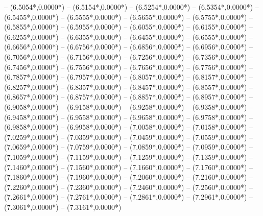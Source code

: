 {	-- ({6.5054*\dx},{0.0000*\dy})
	-- ({6.5154*\dx},{0.0000*\dy})
	-- ({6.5254*\dx},{0.0000*\dy})
	-- ({6.5354*\dx},{0.0000*\dy})
	-- ({6.5455*\dx},{0.0000*\dy})
	-- ({6.5555*\dx},{0.0000*\dy})
	-- ({6.5655*\dx},{0.0000*\dy})
	-- ({6.5755*\dx},{0.0000*\dy})
	-- ({6.5855*\dx},{0.0000*\dy})
	-- ({6.5955*\dx},{0.0000*\dy})
	-- ({6.6055*\dx},{0.0000*\dy})
	-- ({6.6155*\dx},{0.0000*\dy})
	-- ({6.6255*\dx},{0.0000*\dy})
	-- ({6.6355*\dx},{0.0000*\dy})
	-- ({6.6455*\dx},{0.0000*\dy})
	-- ({6.6555*\dx},{0.0000*\dy})
	-- ({6.6656*\dx},{0.0000*\dy})
	-- ({6.6756*\dx},{0.0000*\dy})
	-- ({6.6856*\dx},{0.0000*\dy})
	-- ({6.6956*\dx},{0.0000*\dy})
	-- ({6.7056*\dx},{0.0000*\dy})
	-- ({6.7156*\dx},{0.0000*\dy})
	-- ({6.7256*\dx},{0.0000*\dy})
	-- ({6.7356*\dx},{0.0000*\dy})
	-- ({6.7456*\dx},{0.0000*\dy})
	-- ({6.7556*\dx},{0.0000*\dy})
	-- ({6.7656*\dx},{0.0000*\dy})
	-- ({6.7756*\dx},{0.0000*\dy})
	-- ({6.7857*\dx},{0.0000*\dy})
	-- ({6.7957*\dx},{0.0000*\dy})
	-- ({6.8057*\dx},{0.0000*\dy})
	-- ({6.8157*\dx},{0.0000*\dy})
	-- ({6.8257*\dx},{0.0000*\dy})
	-- ({6.8357*\dx},{0.0000*\dy})
	-- ({6.8457*\dx},{0.0000*\dy})
	-- ({6.8557*\dx},{0.0000*\dy})
	-- ({6.8657*\dx},{0.0000*\dy})
	-- ({6.8757*\dx},{0.0000*\dy})
	-- ({6.8857*\dx},{0.0000*\dy})
	-- ({6.8957*\dx},{0.0000*\dy})
	-- ({6.9058*\dx},{0.0000*\dy})
	-- ({6.9158*\dx},{0.0000*\dy})
	-- ({6.9258*\dx},{0.0000*\dy})
	-- ({6.9358*\dx},{0.0000*\dy})
	-- ({6.9458*\dx},{0.0000*\dy})
	-- ({6.9558*\dx},{0.0000*\dy})
	-- ({6.9658*\dx},{0.0000*\dy})
	-- ({6.9758*\dx},{0.0000*\dy})
	-- ({6.9858*\dx},{0.0000*\dy})
	-- ({6.9958*\dx},{0.0000*\dy})
	-- ({7.0058*\dx},{0.0000*\dy})
	-- ({7.0158*\dx},{0.0000*\dy})
	-- ({7.0259*\dx},{0.0000*\dy})
	-- ({7.0359*\dx},{0.0000*\dy})
	-- ({7.0459*\dx},{0.0000*\dy})
	-- ({7.0559*\dx},{0.0000*\dy})
	-- ({7.0659*\dx},{0.0000*\dy})
	-- ({7.0759*\dx},{0.0000*\dy})
	-- ({7.0859*\dx},{0.0000*\dy})
	-- ({7.0959*\dx},{0.0000*\dy})
	-- ({7.1059*\dx},{0.0000*\dy})
	-- ({7.1159*\dx},{0.0000*\dy})
	-- ({7.1259*\dx},{0.0000*\dy})
	-- ({7.1359*\dx},{0.0000*\dy})
	-- ({7.1460*\dx},{0.0000*\dy})
	-- ({7.1560*\dx},{0.0000*\dy})
	-- ({7.1660*\dx},{0.0000*\dy})
	-- ({7.1760*\dx},{0.0000*\dy})
	-- ({7.1860*\dx},{0.0000*\dy})
	-- ({7.1960*\dx},{0.0000*\dy})
	-- ({7.2060*\dx},{0.0000*\dy})
	-- ({7.2160*\dx},{0.0000*\dy})
	-- ({7.2260*\dx},{0.0000*\dy})
	-- ({7.2360*\dx},{0.0000*\dy})
	-- ({7.2460*\dx},{0.0000*\dy})
	-- ({7.2560*\dx},{0.0000*\dy})
	-- ({7.2661*\dx},{0.0000*\dy})
	-- ({7.2761*\dx},{0.0000*\dy})
	-- ({7.2861*\dx},{0.0000*\dy})
	-- ({7.2961*\dx},{0.0000*\dy})
	-- ({7.3061*\dx},{0.0000*\dy})
	-- ({7.3161*\dx},{0.0000*\dy})
}
